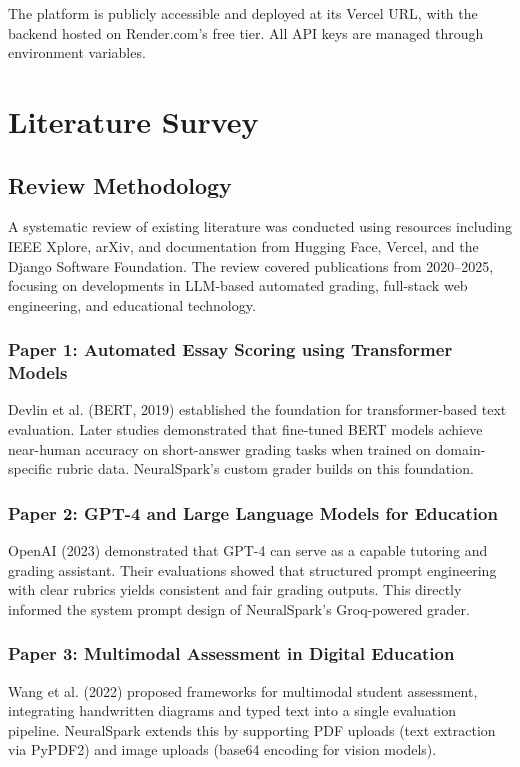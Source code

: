 \documentclass[12pt,a4paper]{report}
\begin{document}
The platform is publicly accessible and deployed at its Vercel URL, with the backend hosted on
Render.com's free tier. All API keys are managed through environment variables.

\chapter{Literature Survey}

\section{Review Methodology}
A systematic review of existing literature was conducted using resources including IEEE Xplore,
arXiv, and documentation from Hugging Face, Vercel, and the Django Software Foundation.
The review covered publications from 2020--2025, focusing on developments in LLM-based automated
grading, full-stack web engineering, and educational technology.

\subsection{Paper 1: Automated Essay Scoring using Transformer Models}
Devlin et al. (BERT, 2019) established the foundation for transformer-based text evaluation.
Later studies demonstrated that fine-tuned BERT models achieve near-human accuracy on short-answer
grading tasks when trained on domain-specific rubric data. NeuralSpark's custom grader builds
on this foundation.

\subsection{Paper 2: GPT-4 and Large Language Models for Education}
OpenAI (2023) demonstrated that GPT-4 can serve as a capable tutoring and grading assistant.
Their evaluations showed that structured prompt engineering with clear rubrics yields consistent
and fair grading outputs. This directly informed the system prompt design of NeuralSpark's
Groq-powered grader.

\subsection{Paper 3: Multimodal Assessment in Digital Education}
Wang et al. (2022) proposed frameworks for multimodal student assessment, integrating handwritten
diagrams and typed text into a single evaluation pipeline. NeuralSpark extends this by
supporting PDF uploads (text extraction via PyPDF2) and image uploads (base64 encoding for
vision models).
\end{document}
